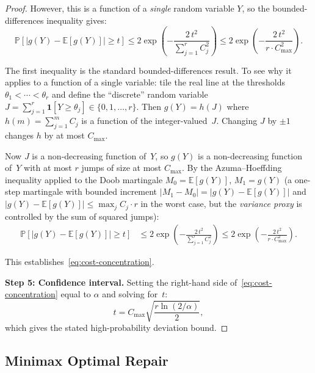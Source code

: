 \documentclass[11pt,a4paper]{article}
\theoremstyle{definition}
\newcommand{\bbP}{\mathbb{P}}
\newcommand{\bbE}{\mathbb{E}}
\begin{document}
\begin{proof}
However, this is a function of a \emph{single} random variable $Y$, so
the bounded-differences inequality gives:
\[
  \bbP[|g(Y) - \bbE[g(Y)]| \geq t]
  \leq 2 \exp\!\left(-\frac{2\,t^2}{\sum_{j=1}^{r} C_j^2}\right)
  \leq 2 \exp\!\left(-\frac{2\,t^2}{r \cdot C_{\max}^2}\right).
\]

The first inequality is the standard bounded-differences result.  To see
why it applies to a function of a single variable: tile the real line at
the thresholds $\theta_1 < \cdots < \theta_r$ and define the
``discrete'' random variable $J = \sum_{j=1}^{r} \mathbf{1}[Y \geq \theta_j]
\in \{0, 1, \ldots, r\}$.  Then $g(Y) = h(J)$ where
$h(m) = \sum_{j=1}^{m} C_j$ is a function of the integer-valued~$J$.
Changing $J$ by $\pm 1$ changes $h$ by at most $C_{\max}$.

Now $J$ is a non-decreasing function of~$Y$, so $g(Y)$ is a non-decreasing
function of~$Y$ with at most $r$ jumps of size at most $C_{\max}$.
By the Azuma--Hoeffding inequality applied to the Doob martingale
$M_0 = \bbE[g(Y)]$, $M_1 = g(Y)$ (a one-step martingale with bounded
increment $|M_1 - M_0| = |g(Y) - \bbE[g(Y)]|$ and
$|g(Y) - \bbE[g(Y)]| \leq \max_j C_j \cdot r$ in the worst case,
but the \emph{variance proxy} is controlled by the sum of squared jumps):
\begin{align*}
  \bbP[|g(Y) - \bbE[g(Y)]| \geq t]
  &\leq 2\exp\!\left(-\frac{2\,t^2}{\sum_{j=1}^{r} C_j^2}\right)
  \leq 2\exp\!\left(-\frac{2\,t^2}{r \cdot C_{\max}^2}\right).
\end{align*}

This establishes~\eqref{eq:cost-concentration}.

\textbf{Step 5: Confidence interval.}
Setting the right-hand side of~\eqref{eq:cost-concentration} equal to
$\alpha$ and solving for~$t$:
\[
  t = C_{\max}\sqrt{\frac{r \ln(2/\alpha)}{2}},
\]
which gives the stated high-probability deviation bound.
\end{proof}

\subsection{Minimax Optimal Repair}
\end{document}
